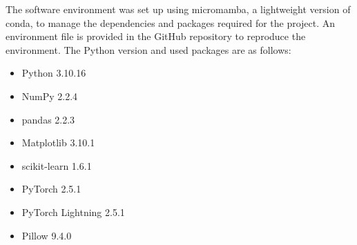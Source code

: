     The software environment was set up using micromamba, a lightweight version of conda, to manage the dependencies and packages required for the project.
    An environment file is provided in the GitHub repository to reproduce the environment.
    The Python version and used packages are as follows:

    \begin{itemize}
        \item Python 3.10.16
        \item NumPy 2.2.4
        \item pandas 2.2.3
        \item Matplotlib 3.10.1
        \item scikit-learn 1.6.1
        \item PyTorch 2.5.1
        \item PyTorch Lightning 2.5.1
        \item Pillow 9.4.0
    \end{itemize}
